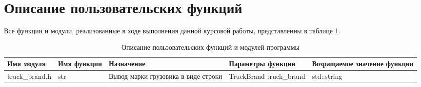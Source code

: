 \section{Описание пользовательских функций}

Все функции и модули, реализованные в ходе выполнения данной курсовой работы, представленны в таблице \ref{funcsnmodules}.

\begin{table}[h!]
	\caption{Описание пользовательских функций и модулей программы}
	\label{funcsnmodules}
	\begin{tabular}{|p{2.5cm}|p{2.5cm}|p{2.5cm}|p{2.5cm}|p{2.5cm}|}
		\hline
		Имя модуля & Имя функции & Назначение & Параметры функции & Возращаемое \nl значение функции \\
		\hline
		truck\_brand.h & str & Вывод марки грузовика в виде строки & TruckBrand truck\_brand & std::string\\
		\hline
	\end{tabular} 
\end{table}